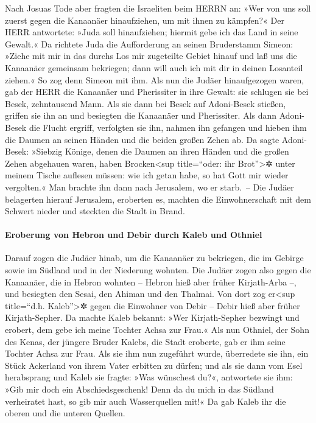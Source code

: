 Nach Josuas Tode aber fragten die Israeliten beim HERRN
an: »Wer von uns soll zuerst gegen die Kanaanäer hinaufziehen, um mit
ihnen zu kämpfen?« Der HERR antwortete: »Juda soll
hinaufziehen; hiermit gebe ich das Land in seine Gewalt.«
Da richtete Juda die Aufforderung an seinen Bruderstamm
Simeon: »Ziehe mit mir in das durchs Los mir zugeteilte Gebiet hinauf
und laß uns die Kanaanäer gemeinsam bekriegen; dann will auch ich mit
dir in deinen Losanteil ziehen.« So zog denn Simeon mit ihm.
Als nun die Judäer hinaufgezogen waren, gab der HERR die
Kanaanäer und Pherissiter in ihre Gewalt: sie schlugen sie bei Besek,
zehntausend Mann. Als sie dann bei Besek auf Adoni-Besek
stießen, griffen sie ihn an und besiegten die Kanaanäer und Pherissiter.
Als dann Adoni-Besek die Flucht ergriff, verfolgten sie
ihn, nahmen ihn gefangen und hieben ihm die Daumen an seinen Händen und
die beiden großen Zehen ab. Da sagte Adoni-Besek: »Siebzig
Könige, denen die Daumen an ihren Händen und die großen Zehen abgehauen
waren, haben Brocken\textless sup title=``oder: ihr Brot''\textgreater✲
unter meinem Tische auflesen müssen: wie ich getan habe, so hat Gott mir
wieder vergolten.« Man brachte ihn dann nach Jerusalem, wo er starb.~--
Die Judäer belagerten hierauf Jerusalem, eroberten es,
machten die Einwohnerschaft mit dem Schwert nieder und steckten die
Stadt in Brand.

\hypertarget{eroberung-von-hebron-und-debir-durch-kaleb-und-othniel}{%
\paragraph{Eroberung von Hebron und Debir durch Kaleb und
Othniel}\label{eroberung-von-hebron-und-debir-durch-kaleb-und-othniel}}

Darauf zogen die Judäer hinab, um die Kanaanäer zu
bekriegen, die im Gebirge sowie im Südland und in der Niederung wohnten.
Die Judäer zogen also gegen die Kanaanäer, die in Hebron
wohnten -- Hebron hieß aber früher Kirjath-Arba --, und besiegten den
Sesai, den Ahiman und den Thalmai. Von dort zog
er\textless sup title=``d.h. Kaleb''\textgreater✲ gegen die Einwohner
von Debir -- Debir hieß aber früher Kirjath-Sepher. Da
machte Kaleb bekannt: »Wer Kirjath-Sepher bezwingt und erobert, dem gebe
ich meine Tochter Achsa zur Frau.« Als nun Othniel, der
Sohn des Kenas, der jüngere Bruder Kalebs, die Stadt eroberte, gab er
ihm seine Tochter Achsa zur Frau. Als sie ihm nun
zugeführt wurde, überredete sie ihn, ein Stück Ackerland von ihrem Vater
erbitten zu dürfen; und als sie dann vom Esel herabsprang und Kaleb sie
fragte: »Was wünschest du?«, antwortete sie ihm: »Gib mir
doch ein Abschiedsgeschenk! Denn da du mich in das Südland verheiratet
hast, so gib mir auch Wasserquellen mit!« Da gab Kaleb ihr die oberen
und die unteren Quellen.


